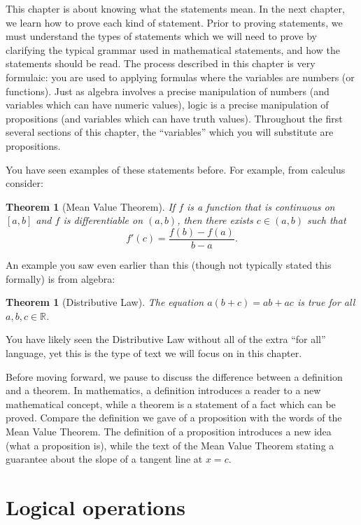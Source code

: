 \documentclass{book}
\newcounter{ekcounter}%
\theoremstyle{ekimcustom}
\newtheorem{theorem}[ekcounter]{Theorem}
\begin{document}
This chapter is about knowing what the statements mean. In the next chapter, we learn how to prove each kind of statement. Prior to proving statements, we must understand the types of statements which we will need to prove by clarifying the typical grammar used in mathematical statements, and how the statements should be read. The process described in this chapter is very formulaic: you are used to applying formulas where the variables are numbers (or functions). Just as algebra involves a precise manipulation of numbers (and variables which can have numeric values), logic is a precise manipulation of propositions (and variables which can have truth values). Throughout the first several sections of this chapter, the ``variables'' which you will substitute are propositions.

You have seen examples of these statements before. For example, from calculus consider:
\begin{theorem}[Mean Value Theorem]
If $f$ is a function that is continuous on $[a,b]$ and $f$ is differentiable on $(a,b)$, then there exists $c \in (a,b)$ such that
\[ f'(c) = \frac{f(b)-f(a)}{b-a}.\]
\end{theorem}
An example you saw even earlier than this (though not typically stated this formally) is from algebra:
\begin{theorem}[Distributive Law]
The equation $a(b+c) = ab+ac$ is true for all $a,b,c \in \mathbb{R}$.
\end{theorem}
You have likely seen the Distributive Law without all of the extra ``for all'' language, yet this is the type of text we will focus on in this chapter.

Before moving forward, we pause to discuss the difference between a definition and a theorem. In mathematics, a definition introduces a reader to a new mathematical concept, while a theorem is a statement of a fact which can be proved. Compare the definition we gave of a proposition with the words of the Mean Value Theorem. The definition of a proposition introduces a new idea (what a proposition is), while the text of the Mean Value Theorem stating a guarantee about the slope of a tangent line at $x=c$.

\section{Logical operations}\label{section:logical-operations}
\end{document}
